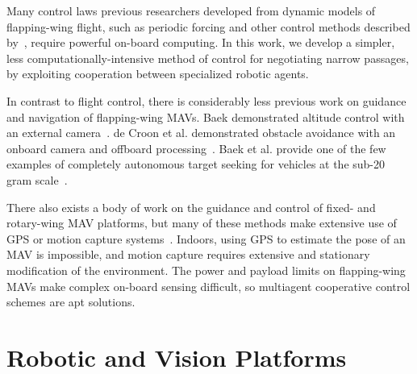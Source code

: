\documentclass{aamas2013}
\begin{document}
Many control laws previous researchers developed from dynamic models of 
flapping-wing flight, such as periodic forcing and other control methods 
described by~\cite{doman:dynamics}\cite{khan:longitudinal_control}\cite{leonard:averaging}, 
require powerful on-board computing. In this work, we develop a simpler, 
less computationally-intensive method of control for negotiating narrow 
passages, by exploiting cooperation between specialized robotic agents.

In contrast to flight control, there is considerably less previous work on 
guidance and navigation of flapping-wing MAVs. Baek demonstrated altitude 
control with an external camera~\cite{baek:altitude}. de Croon et al. 
demonstrated obstacle avoidance with an onboard camera and offboard 
processing~\cite{delfly:avoid}. Baek et al. provide one of the few examples 
of completely autonomous target seeking for vehicles at the sub-20 gram 
scale~\cite{baek:tracking}.

There also exists a body of work on the guidance and control of fixed- and 
rotary-wing MAV platforms, but many of these methods make extensive use of 
GPS or motion capture systems~\cite{kingston:timeattitude}\cite{kanade:3dvision}. 
Indoors, using GPS to estimate the pose of an MAV is impossible, and motion 
capture requires extensive and stationary modification of the environment. 
The power and payload limits on flapping-wing MAVs make complex on-board 
sensing difficult, so multiagent cooperative control schemes are apt 
solutions.

\cite{Jung1998Range}\cite{Hyams1999Cooperative}\cite{Mehta2006Adaptive}
\cite{Rudol2008Micro}\cite{Luo2011Air}


\section{Robotic and Vision Platforms}
\end{document}
